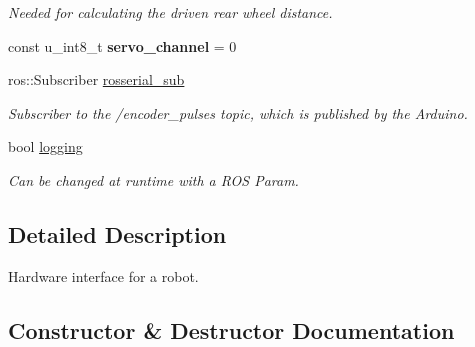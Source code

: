 \begin{DoxyCompactItemize}
\begin{DoxyCompactList}\small\item\em Needed for calculating the driven rear wheel distance. \end{DoxyCompactList}\item 
\mbox{\label{classfennec__ns_1_1_fennec_h_w_interface_af8946e6a059010374d152c428e75c252}} 
const u\+\_\+int8\+\_\+t {\bfseries servo\+\_\+channel} = 0
\item 
\mbox{\label{classfennec__ns_1_1_fennec_h_w_interface_a57306686ca8d401e8ee6c71c77c2b47c}} 
ros\+::\+Subscriber \hyperlink{classfennec__ns_1_1_fennec_h_w_interface_a57306686ca8d401e8ee6c71c77c2b47c}{rosserial\+\_\+sub}
\begin{DoxyCompactList}\small\item\em Subscriber to the /encoder\+\_\+pulses topic, which is published by the Arduino. \end{DoxyCompactList}\item 
\mbox{\label{classfennec__ns_1_1_fennec_h_w_interface_afdb8c91b694144d8f4cd05780e15b0c1}} 
bool \hyperlink{classfennec__ns_1_1_fennec_h_w_interface_afdb8c91b694144d8f4cd05780e15b0c1}{logging}
\begin{DoxyCompactList}\small\item\em Can be changed at runtime with a R\+OS Param. \end{DoxyCompactList}\end{DoxyCompactItemize}


\subsection{Detailed Description}
Hardware interface for a robot. 

\subsection{Constructor \& Destructor Documentation}
\mbox{\label{classfennec__ns_1_1_fennec_h_w_interface_a2efa0dd31094aa112588ba5ca1ff6f69}} 
